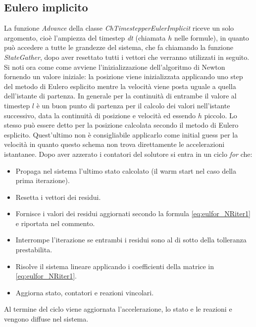 \subsection{Eulero implicito}
La funzione \emph{Advance} della classe \emph{ChTimestepperEulerImplicit} riceve un solo argomento, cioè l'ampiezza del timestep \emph{dt} (chiamata $h$ nelle formule), in quanto può accedere a tutte le grandezze del sistema, che fa chiamando la funzione \emph{StateGather}, dopo aver resettato tutti i vettori che verranno utilizzati in seguito.
Si noti ora come come avviene l'inizializzazione dell'algoritmo di Newton fornendo un valore iniziale: la posizione viene inizializzata applicando uno step del metodo di Eulero esplicito mentre la velocità viene posta uguale a quella dell'istante di partenza. In generale per la continuità di entrambe il valore al timestep $l$ è un buon punto di partenza per il calcolo dei valori nell'istante successivo, data la continuità di posizione e velocità ed essendo $h$ piccolo. Lo stesso può essere detto per la posizione calcolata secondo il metodo di Eulero esplicito. Quest'ultimo non è consigliabile applicarlo come initial guess per la velocità in quanto questo  schema non trova direttamente le accelerazioni istantanee. Dopo aver azzerato i contatori del solutore si entra in un ciclo \emph{for} che: 
\begin{itemize}
    \item Propaga nel sistema l'ultimo stato calcolato (il warm start nel caso della prima iterazione).
    \item Resetta i vettori dei residui.
    \item Fornisce i valori dei residui aggiornati secondo la formula \ref{eq:eulfor_NRiter1} e riportata nel commento.
    \item Interrompe l'iterazione se entrambi i residui sono al di sotto della tolleranza prestabilita.
    \item Risolve il sistema lineare applicando i coefficienti della matrice in \ref{eq:eulfor_NRiter1}.
    \item Aggiorna stato, contatori e reazioni vincolari.
\end{itemize}
Al termine del ciclo viene aggiornata l'accelerazione, lo stato e le reazioni e vengono diffuse nel sistema.
